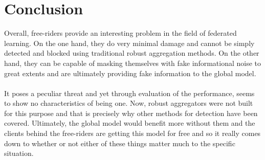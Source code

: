 \section{Conclusion}
Overall, free-riders provide an interesting problem in the field of federated learning.
On the one hand, they do very minimal damage and cannot be simply detected and blocked using traditional robust aggregation methods.
On the other hand, they can be capable of masking themselves with fake informational noise to great extents and are ultimately providing fake information to the global model.
\\ \\
It poses a peculiar threat and yet through evaluation of the performance, seems to show no characteristics of being one.
Now, robust aggregators were not built for this purpose and that is precisely why other methods for detection have been covered.
Ultimately, the global model would benefit more without them and the clients behind the free-riders are getting this model for free and so it really comes down to whether or not either of these things matter much to the specific situation.
